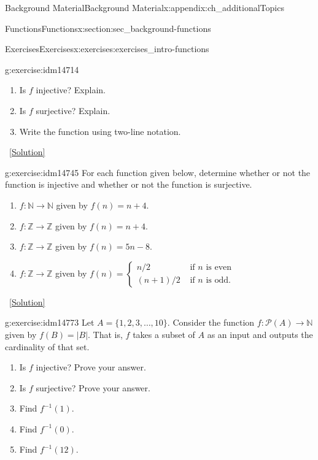 \documentclass[oneside,10pt,]{book}
\numberwithin{equation}{chapter}
\def\N{\mathbb N}
\def\Z{\mathbb Z}
\def\pow{\mathcal P}
\def\inv{^{-1}}
\newcommand{\amp}{&}
\begin{document}
\begin{appendixptx}{Background Material}{}{Background Material}{}{}{x:appendix:ch_additionalTopics}
\begin{sectionptx}{Functions}{}{Functions}{}{}{x:section:sec_background-functions}
\begin{exercises-subsection}{Exercises}{}{Exercises}{}{}{x:exercises:exercises_intro-functions}
\begin{divisionexercise}{4}{}{}{g:exercise:idm14714}
\begin{sidebyside}{1}{0.3}{0.3}{0}
\begin{sbspanel}{0.4}
{
}%
\end{sbspanel}%
\end{sidebyside}%
\par
%
\begin{enumerate}[label=(\alph*)]
\item{}Is \(f\) injective? Explain.%
\item{}Is \(f\) surjective? Explain.%
\item{}Write the function using two-line notation.%
\end{enumerate}
%
\qquad~\hfill{\tiny\hyperlink{g:solution:idm14731-main}{[Solution]}}\end{divisionexercise}%
\begin{divisionexercise}{5}{}{}{g:exercise:idm14745}%
For each function given below, determine whether or not the function is injective and whether or not the function is surjective.%
\begin{enumerate}[label=(\alph*)]
\item{}\(f:\N \to \N\) given by \(f(n) = n+4\).%
\item{}\(f:\Z \to \Z\) given by \(f(n) = n+4\).%
\item{}\(f:\Z \to \Z\) given by \(f(n) = 5n - 8\).%
\item{}\(f:\Z \to \Z\) given by \(f(n) = \begin{cases}n/2 \amp  \text{ if } n \text{ is even} \\ (n+1)/2 \amp \text{ if } n \text{ is odd} . \end{cases}\)%
\end{enumerate}
%
\qquad~\hfill{\tiny\hyperlink{g:solution:idm14761-main}{[Solution]}}\end{divisionexercise}%
\begin{divisionexercise}{6}{}{}{g:exercise:idm14773}%
Let \(A = \{1,2,3,\ldots,10\}\). Consider the function \(f:\pow(A) \to \N\) given by \(f(B) = |B|\). That is, \(f\) takes a subset of \(A\) as an input and outputs the cardinality of that set.%
\begin{enumerate}[label=(\alph*)]
\item{}Is \(f\) injective? Prove your answer.%
\item{}Is \(f\) surjective? Prove your answer.%
\item{}Find \(f\inv(1)\).%
\item{}Find \(f\inv(0)\).%
\item{}Find \(f\inv(12)\).%

\end{enumerate}
\end{divisionexercise}
\end{exercises-subsection}
\end{sectionptx}
\end{appendixptx}
\end{document}
